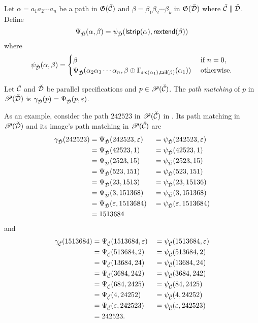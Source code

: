 Let $\alpha = a_1a_2 \dotsm a_n$ be a path in $\mathfrak{G}(\check{\mathcal{C}})$ and $\beta = \beta_1\beta_2\dotsm \beta_k$ in $\mathfrak{G}(\check{\mathcal{D}})$ where $\check{\mathcal{C}} \parallel \check{\mathcal{D}}$. Define
\[
    \Psi_{\check{\mathcal{D}}}(\alpha,\beta) = \psi_{\check{\mathcal{D}}}(\textsf{lstrip}(\alpha),\textsf{rextend}(\beta)) 
\]
where
\[
    \psi_{\check{\mathcal{D}}}(\alpha,\beta) = \begin{cases}
        \beta & \text{ if } n = 0,\\
        \Psi_{\check{\mathcal{D}}}(\alpha_2\alpha_3\dotsm\alpha_n, \beta \oplus \Gamma_{\textsf{src}(\alpha_1),\textsf{tail}(\beta)}(\alpha_1)) & \text{ otherwise}.
    \end{cases}
\]

\begin{definition}\label{def:pathmatch}
Let $\check{\mathcal{C}}$ and $\check{\mathcal{D}}$ be parallel specifications and $p \in \mathscr{P}(\check{\mathcal{C}})$. The \emph{path matching} of $p$ in $\mathscr{P}(\check{\mathcal{D}})$ is $\gamma_{\check{\mathcal{D}}}(p) = \Psi_{\check{\mathcal{D}}}(p,\varepsilon)$.
\end{definition}

As an example, consider the path $242523$ in $\mathscr{P}(\check{\mathcal{C}})$ in . Its path matching in $\mathscr{P}(\check{\mathcal{D}})$ and its image's path matching in $\mathscr{P}(\check{\mathcal{C}})$ are
\begin{alignat*}{3}
    \gamma_{\check{\mathcal{D}}}(242523) &= \Psi_{\check{\mathcal{D}}}(242523, \varepsilon) &&= \psi_{\check{\mathcal{D}}}(242523, \varepsilon)\\
    &= \Psi_{\check{\mathcal{D}}}(42523,1) &&= \psi_{\check{\mathcal{D}}}(42523,1)\\
    &= \Psi_{\check{\mathcal{D}}}(2523,15) &&= \psi_{\check{\mathcal{D}}}(2523,15)\\
    &= \Psi_{\check{\mathcal{D}}}(523,151) &&= \psi_{\check{\mathcal{D}}}(523,151)\\
    &= \Psi_{\check{\mathcal{D}}}(23,1513) &&= \psi_{\check{\mathcal{D}}}(23,15136)\\
    &= \Psi_{\check{\mathcal{D}}}(3,151368) &&= \psi_{\check{\mathcal{D}}}(3,151368)\\
    &= \Psi_{\check{\mathcal{D}}}(\varepsilon,1513684) &&= \psi_{\check{\mathcal{D}}}(\varepsilon,1513684)\\
    &= 1513684
\end{alignat*}
and
\begin{alignat*}{3}
    \gamma_{\check{\mathcal{C}}}(1513684) &= \Psi_{\check{\mathcal{C}}}(1513684, \varepsilon) &&= \psi_{\check{\mathcal{C}}}(1513684, \varepsilon)\\
    &= \Psi_{\check{\mathcal{C}}}(513684, 2) &&= \psi_{\check{\mathcal{C}}}(513684, 2)\\
    &= \Psi_{\check{\mathcal{C}}}(13684, 24) &&= \psi_{\check{\mathcal{C}}}(13684, 24)\\
    &= \Psi_{\check{\mathcal{C}}}(3684, 242) &&= \psi_{\check{\mathcal{C}}}(3684, 242)\\
    &= \Psi_{\check{\mathcal{C}}}(684, 2425) &&= \psi_{\check{\mathcal{C}}}(84, 2425)\\
    &= \Psi_{\check{\mathcal{C}}}(4, 24252) &&= \psi_{\check{\mathcal{C}}}(4, 24252)\\
    &= \Psi_{\check{\mathcal{C}}}(\varepsilon, 242523) &&= \psi_{\check{\mathcal{C}}}(\varepsilon, 242523)\\
    &= 242523.
\end{alignat*}

